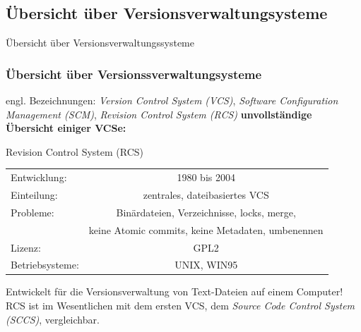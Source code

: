 \documentclass{beamer}
\begin{document}
\subsection{Übersicht über Versionsverwaltungsysteme}
\begin{frame}[c]
\begin{center}
\begin{Huge}
Übersicht über Versionsverwaltungssysteme
\end{Huge}
\end{center}
\end{frame}

\begin{frame}\frametitle{Übersicht über Versionssverwaltungsysteme} 
engl. Bezeichnungen: \textit{Version Control System (VCS)}, \textit{Software Configuration Management (SCM)}, \textit{Revision Control System (RCS)}
\vspace*{0.15cm}
\textbf{unvollständige Übersicht einiger VCSe:}
\begin{block}{Revision Control System (RCS)}
	\begin{tabular}{l c}
Entwicklung: & 1980 bis 2004  \\  
Einteilung: & zentrales, dateibasiertes VCS \\ 
Probleme: & Binärdateien, Verzeichnisse, locks, merge, \\
          & keine Atomic commits, keine Metadaten, umbenennen  \\
Lizenz: & GPL2 \\
Betriebsysteme: & UNIX, WIN95 \\

\end{tabular} 

\vspace*{0.3cm}
Entwickelt für die Versionsverwaltung von Text-Dateien auf einem Computer!
RCS ist im Wesentlichen mit dem ersten VCS, dem \textit{Source Code Control System (SCCS)}, vergleichbar.
\end{block}
\end{frame}
\end{document}
